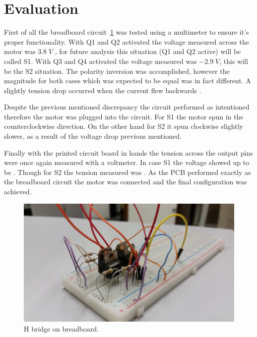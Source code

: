 \section{\textbf{Evaluation}}\label{sec:5}

	First of all the breadboard circuit~\ref{fig:proto_board} was tested using a multimeter to ensure it's proper functionality. With Q1 and Q2 activated the voltage measured across the motor was $3.8\;V$ , for future analysis this situation (Q1 and Q2 active) will be called S1. With Q3 and Q4 activated the voltage measured was $-2.9\;V$, this will be the S2 situation. The polarity inversion was accomplished, however the magnitude for both cases which was expected to be equal was in fact different. A slightly tension drop occurred when the current flew backwards . 
	
	Despite the previous mentioned discrepancy the circuit performed as intentioned therefore the motor was plugged into the circuit. For S1 the motor spun in the counterclockwise direction. On the other hand for S2 it spun clockwise slightly slower, as a result of the voltage drop previous mentioned.
	
	Finally with the printed circuit board in hands the tension across the output pins were once again measured with a voltmeter. In case S1 the voltage showed up to be . Though for S2 the tension measured was . As the PCB performed exactly as the breadboard circuit the motor was connected and the final configuration was achieved. 

\begin{figure}[t]
\centering
\centering%
\includegraphics[height=.30\textwidth]{img/h_bridge_proto_close.jpg}
\caption{H bridge on breadboard.}
\label{fig:proto_board}%
\end{figure}
